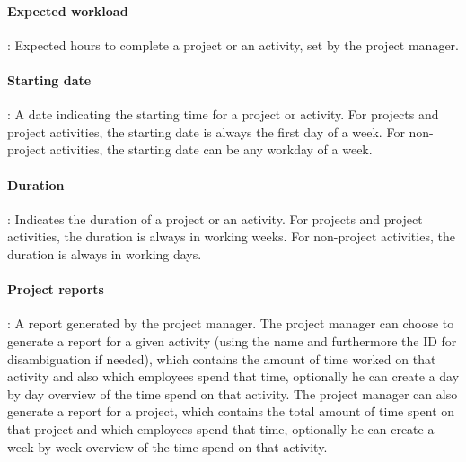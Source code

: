 \paragraph{Expected workload}: Expected hours to complete a project or an activity, set by the project manager.
\paragraph{Starting date}: A date indicating the starting time for a project or activity. For projects and project activities, the starting date is always the first day of a week. For non-project activities, the starting date can be any workday of a week.
\paragraph{Duration}: Indicates the duration of a project or an activity. For projects and project activities, the duration is always in working weeks. For non-project activities, the duration is always in working days.
\paragraph{Project reports}: A report generated by the project manager. The project manager can choose to generate a report for a given activity (using the name and furthermore the ID for disambiguation if needed), which contains the amount of time worked on that activity and also which employees spend that time, optionally he can create a day by day overview of the time spend on that activity. The project manager can also generate a report for a project, which contains the total amount of time spent on that project and which employees spend that time, optionally he can create a week by week overview of the time spend on that activity.






